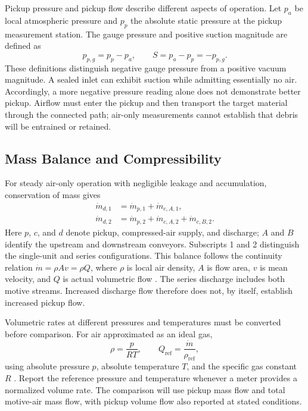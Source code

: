 Pickup pressure and pickup flow describe different aspects of operation. Let $p_a$ be local atmospheric pressure and $p_p$ the absolute static pressure at the pickup measurement station. The gauge pressure and positive suction magnitude are defined as
\begin{equation}
 p_{p,g}=p_p-p_a, \qquad S=p_a-p_p=-p_{p,g}.
 \label{eq:pickup-pressure}
\end{equation}
These definitions distinguish negative gauge pressure from a positive vacuum magnitude. A sealed inlet can exhibit suction while admitting essentially no air. Accordingly, a more negative pressure reading alone does not demonstrate better pickup. Airflow must enter the pickup and then transport the target material through the connected path; air-only measurements cannot establish that debris will be entrained or retained.

\subsection{Mass Balance and Compressibility}
For steady air-only operation with negligible leakage and accumulation, conservation of mass gives
\begin{align}
 \dot m_{d,1} &= \dot m_{p,1}+\dot m_{c,A,1}, \\
 \dot m_{d,2} &= \dot m_{p,2}+\dot m_{c,A,2}+\dot m_{c,B,2}.
 \label{eq:conveyor-mass-balance}
\end{align}
Here $p$, $c$, and $d$ denote pickup, compressed-air supply, and discharge; $A$ and $B$ identify the upstream and downstream conveyors. Subscripts 1 and 2 distinguish the single-unit and series configurations. This balance follows the continuity relation $\dot m=\rho A v=\rho Q$, where $\rho$ is local air density, $A$ is flow area, $v$ is mean velocity, and $Q$ is actual volumetric flow \citep{nasaMassFlowChoking}. The series discharge includes both motive streams. Increased discharge flow therefore does not, by itself, establish increased pickup flow.

Volumetric rates at different pressures and temperatures must be converted before comparison. For air approximated as an ideal gas,
\begin{equation}
 \rho=\frac{p}{RT}, \qquad Q_{\mathrm{ref}}=\frac{\dot m}{\rho_{\mathrm{ref}}},
 \label{eq:flow-reference}
\end{equation}
using absolute pressure $p$, absolute temperature $T$, and the specific gas constant $R$ \citep{nasaMassFlowChoking}. Report the reference pressure and temperature whenever a meter provides a normalized volume rate. The comparison will use pickup mass flow and total motive-air mass flow, with pickup volume flow also reported at stated conditions.

